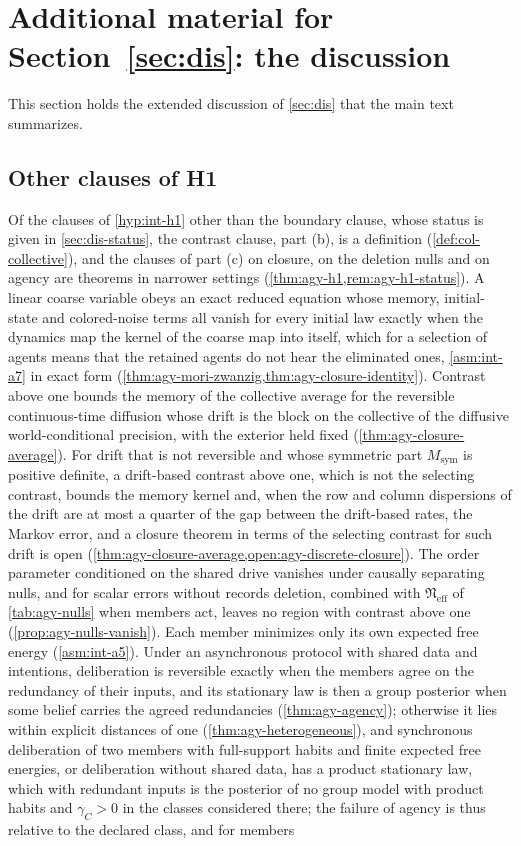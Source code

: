 \section{Additional material for \texorpdfstring{Section~\ref{sec:dis}}{Section 18}: the discussion}\label{sup:dis}

This section holds the extended discussion of \cref{sec:dis} that the main text summarizes.

\subsection{Other clauses of H1}\label{sup:dis-other-clauses-of-h1}

Of the clauses of \cref{hyp:int-h1} other than the boundary clause, whose status is given in \cref{sec:dis-status}, the contrast clause, part (b), is a definition (\cref{def:col-collective}), and the clauses of part (c) on closure, on the deletion nulls and on agency are theorems in narrower settings (\cref{thm:agy-h1,rem:agy-h1-status}). A linear coarse variable obeys an exact reduced equation whose memory, initial-state and colored-noise terms all vanish for every initial law exactly when the dynamics map the kernel of the coarse map into itself, which for a selection of agents means that the retained agents do not hear the eliminated ones, \cref{asm:int-a7} in exact form (\cref{thm:agy-mori-zwanzig,thm:agy-closure-identity}). Contrast above one bounds the memory of the collective average for the reversible continuous-time diffusion whose drift is the block on the collective of the diffusive world-conditional precision, with the exterior held fixed (\cref{thm:agy-closure-average}). For drift that is not reversible and whose symmetric part $M_{\mathrm{sym}}$ is positive definite, a drift-based contrast above one, which is not the selecting contrast, bounds the memory kernel and, when the row and column dispersions of the drift are at most a quarter of the gap between the drift-based rates, the Markov error, and a closure theorem in terms of the selecting contrast for such drift is open (\cref{thm:agy-closure-average,open:agy-discrete-closure}). The order parameter conditioned on the shared drive vanishes under causally separating nulls, and for scalar errors without records deletion, combined with $\mathfrak N_{\mathrm{eff}}$ of \cref{tab:agy-nulls} when members act, leaves no region with contrast above one (\cref{prop:agy-nulls-vanish}). Each member minimizes only its own expected free energy (\cref{asm:int-a5}). Under an asynchronous protocol with shared data and intentions, deliberation is reversible exactly when the members agree on the redundancy of their inputs, and its stationary law is then a group posterior when some belief carries the agreed redundancies (\cref{thm:agy-agency}); otherwise it lies within explicit distances of one (\cref{thm:agy-heterogeneous}), and synchronous deliberation of two members with full-support habits and finite expected free energies, or deliberation without shared data, has a product stationary law, which with redundant inputs is the posterior of no group model with product habits and $\gamma_C>0$ in the classes considered there; the failure of agency is thus relative to the declared class, and for members 